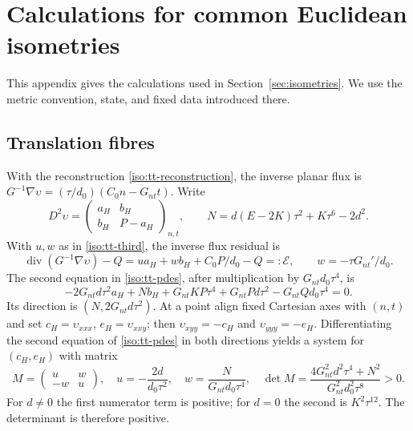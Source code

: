 \documentclass[11pt,a4paper]{article}
\numberwithin{equation}{section}
\theoremstyle{plain}
\theoremstyle{definition}
\theoremstyle{remark}
\begin{document}
\section{Calculations for common Euclidean isometries}
\label{appiso-calculation}

This appendix gives the calculations used in
Section~\ref{sec:isometries}. We use the metric convention, state,
and fixed data introduced there. 

\subsection{Translation fibres}\label{appiso-tt}
With the reconstruction \eqref{iso:tt-reconstruction}, the inverse
planar flux is $G^{-1}\nabla\upsilon=(\tau/d_0)(C_0n-G_{nt}t)$.
Write
\[
 D^2\upsilon=\begin{pmatrix}a_H&b_H\\b_H&P-a_H\end{pmatrix}_{n,t},\qquad
 N=d(E-2K)\tau^2+K\tau^6-2d^2.
\]
With $u,w$ as in \eqref{iso:tt-third}, the inverse flux residual is
\[
 \operatorname{div}(G^{-1}\nabla\upsilon)-Q
       =u a_H+w b_H+C_0P/d_0-Q=:\mathcal E,
 \qquad w=-\tau G_{nt}'/d_0.
\]
The second equation in \eqref{iso:tt-pdes}, after multiplication by
$G_{nt}d_0\tau^4$, is
\begin{equation}\label{iso:tt-line}
 -2G_{nt}d\tau^2a_H+N b_H+G_{nt}KP\tau^4+G_{nt}Pd\tau^2-G_{nt}Qd_0\tau^4=0.
\end{equation}
Its direction is $(N,2G_{nt}d\tau^2)$.  At a point align fixed Cartesian axes
with $(n,t)$ and set $c_H=\upsilon_{xxx}$, $e_H=\upsilon_{xxy}$; then
$\upsilon_{xyy}=-c_H$ and $\upsilon_{yyy}=-e_H$.  Differentiating the second equation
of \eqref{iso:tt-pdes} in both directions yields a system for $(c_H,e_H)$
with matrix
\begin{equation}\label{iso:tt-third}
 M=\begin{pmatrix}u&w\\-w&u\end{pmatrix},\quad
 u=-\frac{2d}{d_0\tau^2},\quad w=\frac{N}{G_{nt}d_0\tau^4},\quad
 \det M=\frac{4G_{nt}^2d^2\tau^4+N^2}{G_{nt}^2d_0^2\tau^8}>0.
\end{equation}
For $d\ne0$ the first numerator term is positive; for $d=0$ the second
is $K^2\tau^{12}$.  The determinant is therefore positive.
\end{document}
